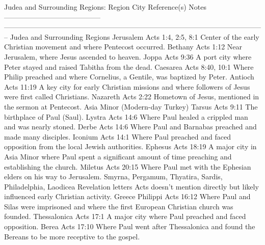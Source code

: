 Judea and Surrounding Regions: \textbar{} Region \textbar{} City \textbar{} Reference(s) \textbar{} Notes \textbar{} \textbar---------------------------\textbar--------------\textbar---------------------------------------\textbar-----------------------------------------------------------------------\textbar{} \textbar{} Judea and Surrounding Regions \textbar{} Jerusalem \textbar{} Acts 1:4, 2:5, 8:1 \textbar{} Center of the early Christian movement and where Pentecost occurred.
\textbar{} \textbar{} \textbar{} Bethany \textbar{} Acts 1:12 \textbar{} Near Jerusalem, where Jesus ascended to heaven.
\textbar{} \textbar{} \textbar{} Joppa \textbar{} Acts 9:36 \textbar{} A port city where Peter stayed and raised Tabitha from the dead.
\textbar{} \textbar{} \textbar{} Caesarea \textbar{} Acts 8:40, 10:1 \textbar{} Where Philip preached and where Cornelius, a Gentile, was baptized by Peter.
\textbar{} \textbar{} \textbar{} Antioch \textbar{} Acts 11:19 \textbar{} A key city for early Christian missions and where followers of Jesus were first called Christians.
\textbar{} \textbar{} \textbar{} Nazareth \textbar{} Acts 2:22 \textbar{} Hometown of Jesus, mentioned in the sermon at Pentecost.
\textbar{} \textbar{} Asia Minor (Modern-day Turkey) \textbar{} Tarsus \textbar{} Acts 9:11 \textbar{} The birthplace of Paul (Saul).
\textbar{} \textbar{} \textbar{} Lystra \textbar{} Acts 14:6 \textbar{} Where Paul healed a crippled man and was nearly stoned.
\textbar{} \textbar{} \textbar{} Derbe \textbar{} Acts 14:6 \textbar{} Where Paul and Barnabas preached and made many disciples.
\textbar{} \textbar{} \textbar{} Iconium \textbar{} Acts 14:1 \textbar{} Where Paul preached and faced opposition from the local Jewish authorities.
\textbar{} \textbar{} \textbar{} Ephesus \textbar{} Acts 18:19 \textbar{} A major city in Asia Minor where Paul spent a significant amount of time preaching and establishing the church.
\textbar{} \textbar{} \textbar{} Miletus \textbar{} Acts 20:15 \textbar{} Where Paul met with the Ephesian elders on his way to Jerusalem.
\textbar{} \textbar{} \textbar{} Smyrna, Pergamum, Thyatira, Sardis, Philadelphia, Laodicea \textbar{} Revelation letters \textbar{} Acts doesn't mention directly but likely influenced early Christian activity.
\textbar{} \textbar{} Greece \textbar{} Philippi \textbar{} Acts 16:12 \textbar{} Where Paul and Silas were imprisoned and where the first European Christian church was founded.
\textbar{} \textbar{} \textbar{} Thessalonica \textbar{} Acts 17:1 \textbar{} A major city where Paul preached and faced opposition.
\textbar{} \textbar{} \textbar{} Berea \textbar{} Acts 17:10 \textbar{} Where Paul went after Thessalonica and found the Bereans to be more receptive to the gospel.
